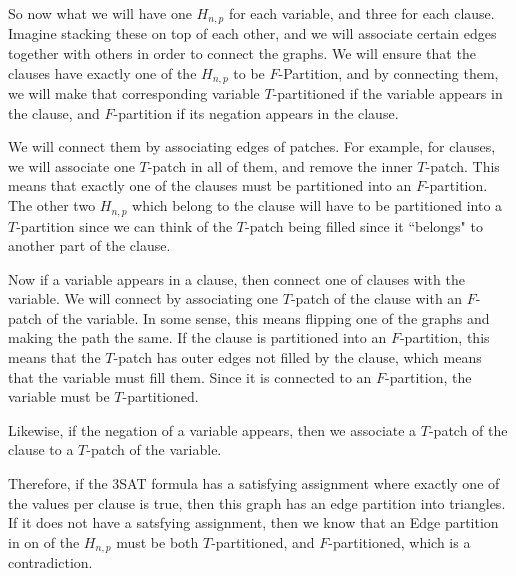 \documentclass[runningheads,a4paper]{llncs}
\begin{document}
So now what we will have one $H_{n,p}$ for each variable, and three for each clause. Imagine stacking these on top of each other, and we will associate certain edges together with others in order to connect the graphs. We will ensure that the clauses have exactly one of the $H_{n,p}$ to be $F$-Partition, and by connecting them, we will make that corresponding variable $T$-partitioned if the variable appears in the clause, and $F$-partition if its negation appears in the clause. 

We will connect them by associating edges of patches. For example, for clauses, we will associate one $T$-patch in all of them, and remove the inner $T$-patch. This means that exactly one of the clauses must be partitioned into an $F$-partition. The other two $H_{n,p}$ which belong to the clause will have to be partitioned into a $T$-partition since we can think of the $T$-patch being filled since it ``belongs" to another part of the clause. 

Now if a variable appears in a clause, then connect one of clauses with the variable. We will connect by associating one $T$-patch of the clause with an $F$-patch of the variable. In some sense, this means flipping one of the graphs and making the path the same. If the clause is partitioned into an $F$-partition, this means that the $T$-patch has outer edges not filled by the clause, which means that the variable must fill them. Since it is connected to an $F$-partition, the variable must be $T$-partitioned. 

Likewise, if the negation of a variable appears, then we associate a $T$-patch of the clause to a $T$-patch of the variable. 

Therefore, if the 3SAT formula has a satisfying assignment where exactly one of the values per clause is true, then this graph has an edge partition into triangles. If it does not have a satsfying assignment, then we know that an Edge partition in on of the $H_{n,p}$ must be both $T$-partitioned, and $F$-partitioned, which is a contradiction.



\end{document}
